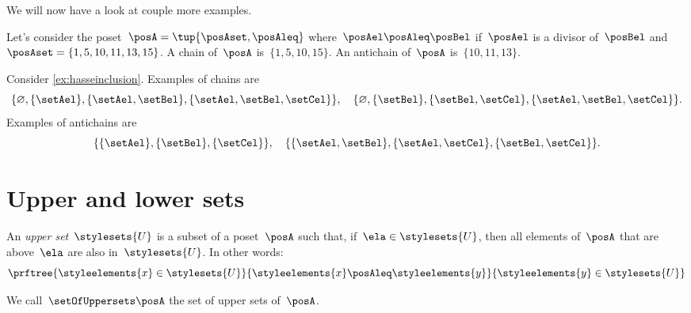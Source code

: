 We will now have a look at couple more examples.
\begin{example}
    Let's consider the poset~$\posA=\tup{\posAset,\posAleq}$ where~$\posAel \posAleq \posBel$ if~$\posAel$ is a divisor of~$\posBel$ and~$\posAset=\{1,5,10,11,13,15\}$.
    A chain of~$\posA$ is~$\{1,5,10,15\}$.
    An antichain of~$\posA$ is~$\{10,11,13\}$.
\end{example}

\begin{example}
    Consider \cref{ex:hasseinclusion}.
    Examples of chains are
    \begin{equation}
        \{\varnothing,\{\setAel\},\{\setAel,\setBel\},\{\setAel,\setBel,\setCel\}\}, \quad  \{\varnothing,\{\setBel\},\{\setBel,\setCel\},\{\setAel,\setBel,\setCel\}\}.
    \end{equation}
    Examples of antichains are
    \begin{equation}
        \{\{\setAel\},\{\setBel\},\{\setCel\}\}, \quad \{ \{\setAel,\setBel\},\{\setAel,\setCel\}, \{\setBel,\setCel\}\}.
    \end{equation}
\end{example}


\section{Upper and lower sets}
\label{sec:UpperLowerSets}


\begin{definition}
    \label{def:upperset}
    An \emph{upper set}~$\stylesets{U}$ is a subset of a poset~$\posA$ such
    that, if~$\ela \in \stylesets{U}$, then all elements of~$\posA$ that are above~$\ela$ are also in~$\stylesets{U}$.
    In other words:
    \begin{equation}
        \prftree{\styleelements{x}\in \stylesets{U}}{\styleelements{x}\posAleq \styleelements{y}}{\styleelements{y}\in \stylesets{U}}
    \end{equation}
\end{definition}
We call~$\setOfUppersets \posA$ the set of upper sets of~$\posA$.

